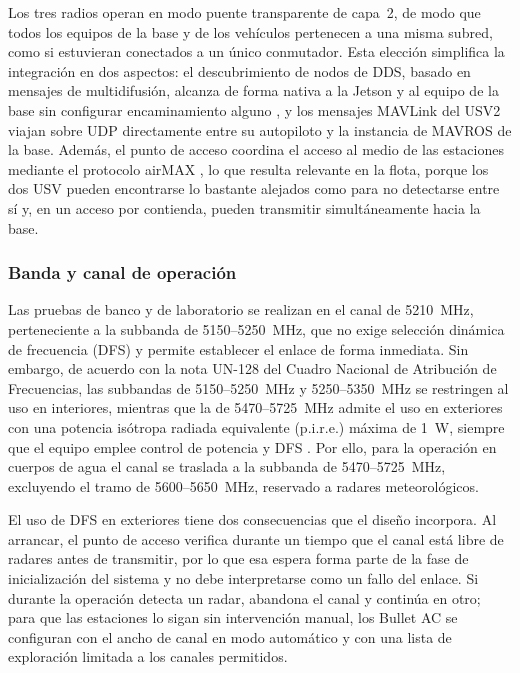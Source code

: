 Los tres radios operan en modo puente transparente de capa~2, de modo que todos los equipos de la base y de 
los vehículos pertenecen a una misma subred, como si estuvieran conectados a un único conmutador. Esta elección 
simplifica la integración en dos aspectos: el descubrimiento de nodos de DDS, basado en mensajes de multidifusión, 
alcanza de forma nativa a la Jetson y al equipo de la base sin configurar encaminamiento alguno 
\cite{albatati2026}, y los mensajes MAVLink del USV2 viajan sobre UDP directamente entre su autopiloto y la 
instancia de MAVROS de la base. Además, el punto de acceso coordina el acceso al medio de las estaciones 
mediante el protocolo airMAX \cite{Cite25}, lo que resulta relevante en la flota, porque los dos USV 
pueden encontrarse lo bastante alejados como para no detectarse entre sí y, en un acceso por contienda, 
pueden transmitir simultáneamente hacia la base.
 
\subsubsection{Banda y canal de operación}
 
Las pruebas de banco y de laboratorio se realizan en el canal de 5210~MHz, perteneciente a la subbanda de 
5150--5250~MHz, que no exige selección dinámica de frecuencia (DFS) y permite establecer el enlace de forma 
inmediata. Sin embargo, de acuerdo con la nota UN-128 del Cuadro Nacional de Atribución de Frecuencias, las 
subbandas de 5150--5250~MHz y 5250--5350~MHz se restringen al uso en interiores, mientras que la de 
5470--5725~MHz admite el uso en exteriores con una potencia isótropa radiada equivalente (p.i.r.e.) máxima de 
1~W, siempre que el equipo emplee control de potencia y DFS \cite{cnaf}. Por ello, para la operación en cuerpos 
de agua el canal se traslada a la subbanda de 5470--5725~MHz, excluyendo el tramo de 5600--5650~MHz, reservado 
a radares meteorológicos.
 
El uso de DFS en exteriores tiene dos consecuencias que el diseño incorpora. Al arrancar, el punto de acceso 
verifica durante un tiempo que el canal está libre de radares antes de transmitir, por lo que esa espera forma 
parte de la fase de inicialización del sistema y no debe interpretarse como un fallo del enlace. Si durante la 
operación detecta un radar, abandona el canal y continúa en otro; para que las estaciones lo sigan sin 
intervención manual, los Bullet AC se configuran con el ancho de canal en modo automático y con una lista de 
exploración limitada a los canales permitidos.
 
